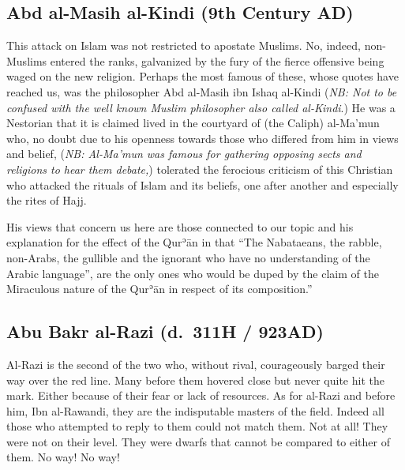 \documentclass[12pt]{book}
\def \Quran{Qurʾān} %
\def \Qrn{\Quran}   %
\newcommand{\NB}[1]{\emph{\small NB: #1}}
\begin{document}


\subsection{Abd al-Masih al-Kindi (9th Century AD)}

This attack on Islam was not restricted to apostate Muslims. No, indeed,
non-Muslims entered the ranks, galvanized by the fury of the fierce offensive
being waged on the new religion. Perhaps the most famous of these, whose quotes
have reached us, was the philosopher Abd al-Masih ibn Ishaq al-Kindi
(\NB{Not to be confused with the well known Muslim philosopher also called
al-Kindi}.)
He was a Nestorian that it is claimed lived in the courtyard of (the Caliph)
al-Ma’mun who, no doubt due to his openness towards those who differed from him
in views and belief,
(\NB{Al-Ma’mun was famous for gathering opposing sects and religions to hear
them debate,})
tolerated the ferocious criticism of this
Christian who attacked the rituals of Islam and its beliefs, one after another
and especially the rites of Hajj.

His views that concern us here are those connected to our topic and his
explanation for the effect of the \Qrn{} in that “The Nabataeans, the rabble,
non-Arabs, the gullible and the ignorant who have no understanding of the
Arabic language”, are the only ones who would be duped by the claim of the
Miraculous nature of the \Qrn{} in respect of its composition.”\footnotemark



\subsection{Abu Bakr al-Razi (d.\ 311H / 923AD)}

Al-Razi is the second of the two who, without rival,
courageously barged their way over the red line.
Many before them hovered close but never quite hit the mark.
Either because of their fear or lack of resources.
As for al-Razi and before him, Ibn al-Rawandi, they are the indisputable
masters of the field.
Indeed all those who attempted to reply to them could not match them.
Not at all! They were not on their level.
They were dwarfs that cannot be compared to either of them.
No way! No way!
\end{document}
